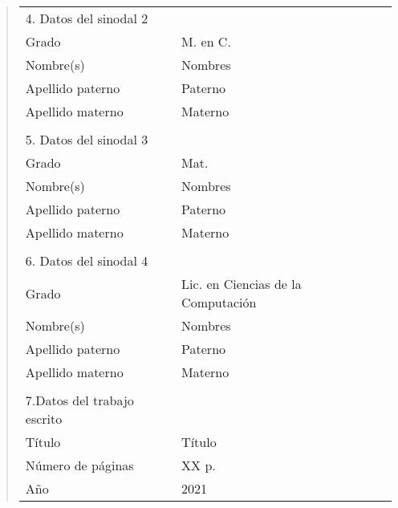 \begin{quote}
\begin{tabular}{lll}
4. Datos del sinodal 2      & {}                                          \\
Grado                       & M. en C.                                    \\
Nombre(s)                   & Nombres                                     \\
Apellido paterno            & Paterno                                     \\
Apellido materno            & Materno                                     \\
{}                          & {}                                          \\
5. Datos del sinodal 3      & {}                                          \\
Grado                       & Mat.                                        \\
Nombre(s)                   & Nombres                                     \\
Apellido paterno            & Paterno                                     \\
Apellido materno            & Materno                                     \\
{}                          & {}                                          \\
6. Datos del sinodal 4      & {}                                          \\
Grado                       & Lic. en Ciencias de la Computaci\'on        \\
Nombre(s)                   & Nombres                                     \\
Apellido paterno            & Paterno                                     \\
Apellido materno            & Materno                                     \\
{}                          & {}                                          \\
7.Datos del trabajo escrito & {}                                          \\
T\'itulo                    & T\'itulo                                    \\
N\'umero de p\'aginas       & XX p.                                       \\
A\~no                       & 2021                                        \\
\end{tabular}
\end{quote}
